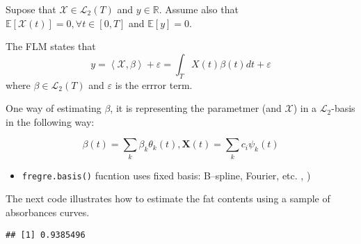 \documentclass[
]{book}
\newenvironment{Shaded}{\begin{snugshade}}{\end{snugshade}}
\newcommand{\AttributeTok}[1]{\textcolor[rgb]{0.77,0.63,0.00}{#1}}
\newcommand{\DecValTok}[1]{\textcolor[rgb]{0.00,0.00,0.81}{#1}}
\newcommand{\FunctionTok}[1]{\textcolor[rgb]{0.00,0.00,0.00}{#1}}
\newcommand{\NormalTok}[1]{#1}
\newcommand{\OtherTok}[1]{\textcolor[rgb]{0.56,0.35,0.01}{#1}}
\newcommand{\SpecialCharTok}[1]{\textcolor[rgb]{0.00,0.00,0.00}{#1}}
\providecommand{\tightlist}{%
  \setlength{\itemsep}{0pt}\setlength{\parskip}{0pt}}
\begin{document}
Supose that \(\mathcal{X} \in \mathcal{L}_{2}(T)\) and \(y \in \mathbb{R}\). Assume also that
\(\mathbb{E}[\mathcal{X}(t)]=0, \forall t \in [0,T]\) and \(\mathbb{E}[y]=0\).

The FLM states that
\[y= \left\langle  \mathcal{X},\beta \right\rangle +\varepsilon=\int_{T}X(t)\beta(t)dt+\varepsilon\]
where \(\beta \in \mathcal{L}_{2}(T)\) and \(\varepsilon\) is the errror term.

One way of estimating \(\beta\), it is representing the parametmer (and \(\mathcal{X}\)) in a \(\mathcal{L}_2\)-basis in the following way:

\[\beta(t)=\sum_k \beta_k \theta_k(t), \mathbf{X}(t)=\sum_k c_i \psi_k(t)\]

\begin{itemize}
\tightlist
\item
  \texttt{fregre.basis()} fucntion uses fixed basis: B--spline, Fourier, etc. \citet{RS2005}, \citet{Cardot_1999})
\end{itemize}

The next code illustrates how to estimate the fat contents using a sample of absorbances curves.

\begin{Shaded}
\end{Shaded}

\begin{verbatim}
## [1] 0.9385496
\end{verbatim}
\end{document}
